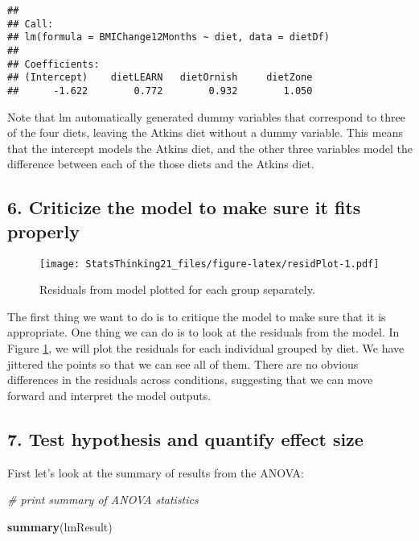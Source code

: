 \documentclass[]{book}
\newenvironment{Shaded}{\begin{snugshade}}{\end{snugshade}}
\newcommand{\KeywordTok}[1]{\textcolor[rgb]{0.13,0.29,0.53}{\textbf{#1}}}
\newcommand{\CommentTok}[1]{\textcolor[rgb]{0.56,0.35,0.01}{\textit{#1}}}
\newcommand{\NormalTok}[1]{#1}
\theoremstyle{definition}
\theoremstyle{definition}
\theoremstyle{definition}
\theoremstyle{remark}
\begin{document}
\begin{verbatim}
## 
## Call:
## lm(formula = BMIChange12Months ~ diet, data = dietDf)
## 
## Coefficients:
## (Intercept)    dietLEARN   dietOrnish     dietZone  
##      -1.622        0.772        0.932        1.050
\end{verbatim}

Note that lm automatically generated dummy variables that correspond to
three of the four diets, leaving the Atkins diet without a dummy
variable. This means that the intercept models the Atkins diet, and the
other three variables model the difference between each of the those
diets and the Atkins diet.

\subsection{6. Criticize the model to make sure it fits
properly}\label{criticize-the-model-to-make-sure-it-fits-properly}

\begin{figure}
\centering
\texttt{[image: StatsThinking21\_files/figure-latex/residPlot-1.pdf]}
\caption{\label{fig:residPlot}Residuals from model plotted for each group
separately.}
\end{figure}

The first thing we want to do is to critique the model to make sure that
it is appropriate. One thing we can do is to look at the residuals from
the model. In Figure \ref{fig:residPlot}, we will plot the residuals for
each individual grouped by diet. We have jittered the points so that we
can see all of them. There are no obvious differences in the residuals
across conditions, suggesting that we can move forward and interpret the
model outputs.

\subsection{7. Test hypothesis and quantify effect
size}\label{test-hypothesis-and-quantify-effect-size}

First let's look at the summary of results from the ANOVA:

\begin{Shaded}
\begin{Highlighting}[]
\CommentTok{# print summary of ANOVA statistics}

\KeywordTok{summary}\NormalTok{(lmResult)}
\end{Highlighting}
\end{Shaded}
\end{document}
